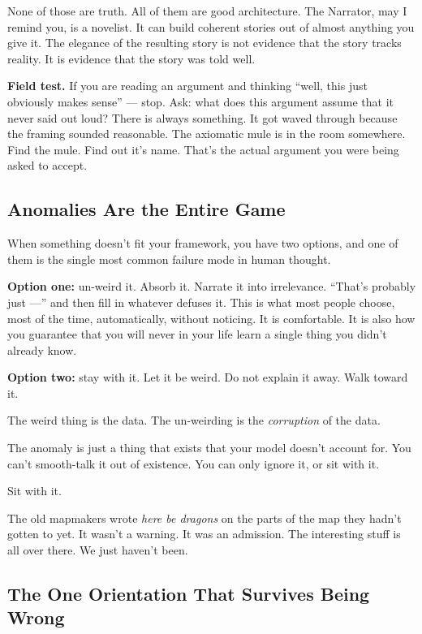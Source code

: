 \documentclass[11pt, letterpaper]{article}
\begin{document}
None of those are truth. All of them are good architecture. The Narrator, may I remind you, is a novelist. It can build coherent stories out of almost anything you give it. The elegance of the resulting story is not evidence that the story tracks reality. It is evidence that the story was told well.

\begin{dangerbox}
\textbf{Field test.} If you are reading an argument and thinking ``well, this just obviously makes sense'' --- stop. Ask: what does this argument assume that it never said out loud? There is always something. It got waved through because the framing sounded reasonable. The axiomatic mule is in the room somewhere. Find the mule. Find out it's name. That's the actual argument you were being asked to accept.
\end{dangerbox}

\subsection{Anomalies Are the Entire Game}

When something doesn't fit your framework, you have two options, and one of them is the single most common failure mode in human thought.

\textbf{Option one:} un-weird it. Absorb it. Narrate it into irrelevance. ``That's probably just ---'' and then fill in whatever defuses it. This is what most people choose, most of the time, automatically, without noticing. It is comfortable. It is also how you guarantee that you will never in your life learn a single thing you didn't already know.

\textbf{Option two:} stay with it. Let it be weird. Do not explain it away. Walk toward it.

The weird thing is the data. The un-weirding is the \textit{corruption} of the data.

The anomaly is just a thing that exists that your model doesn't account for. You can't smooth-talk it out of existence. You can only ignore it, or sit with it.

Sit with it.

The old mapmakers wrote \textit{here be dragons} on the parts of the map they hadn't gotten to yet. It wasn't a warning. It was an admission. The interesting stuff is all over there. We just haven't been.

\subsection{The One Orientation That Survives Being Wrong}
\end{document}

